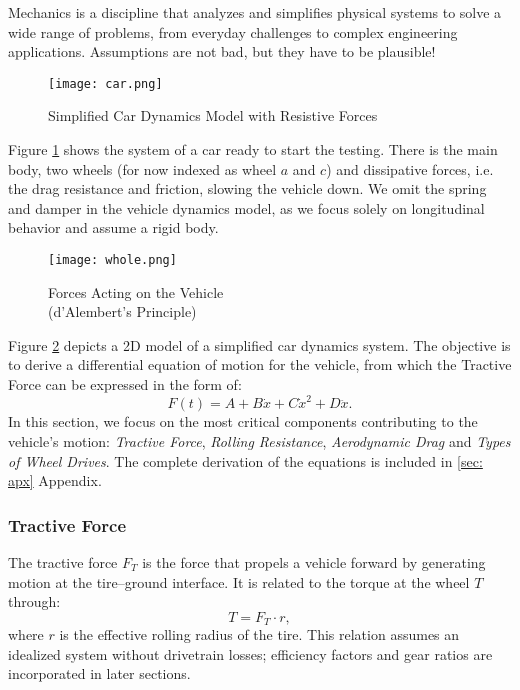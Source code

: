 Mechanics is a discipline that analyzes and simplifies physical systems to solve a wide range of problems, from everyday challenges to complex engineering applications. Assumptions are not bad, but they have to be plausible!
\begin{figure}[H]
	\begin{center}
		\texttt{[image: car.png]}
	\end{center}
	\caption{Simplified Car Dynamics Model with Resistive Forces}
	\label{fig: model}
\end{figure}
	Figure \ref{fig: model} shows the system of a car ready to start the testing. There is the main body, two wheels (for now indexed as wheel $a$ and $c$) and dissipative forces, i.e. the drag resistance and friction, slowing the vehicle down. We omit the spring and damper in the vehicle dynamics model, as we focus solely on longitudinal behavior and assume a rigid body.
\begin{figure}[H]
	\begin{center}
		\texttt{[image: whole.png]}
	\end{center}
	\caption{Forces Acting on the Vehicle \\(d'Alembert's Principle)}
	\label{fig: forces}
\end{figure}
Figure \ref{fig: forces} depicts a 2D model of a simplified car dynamics system. The objective is to derive a differential equation of motion for the vehicle, from which the Tractive Force can be expressed in the form of:
\begin{equation*}
	F(t) = A + B\dot x + C\dot x^2 + D\ddot x.
\end{equation*}
In this section, we focus on the most critical components contributing to the vehicle's motion:  \textit{Tractive Force}, \textit{Rolling Resistance}, \textit{Aerodynamic Drag} and \textit{Types of Wheel Drives}. The complete derivation of the equations is included in \ref{sec: apx} Appendix.
\subsubsection*{Tractive Force}
	The tractive force $F_T$ is the force that propels a vehicle forward by generating motion at the tire–ground interface. It is related to the torque at the wheel $T$ through:
	\begin{equation*}
		T = F_T\cdot r,
	\end{equation*}
	where $r$ is the effective rolling radius of the tire. This relation assumes an idealized system without drivetrain losses; efficiency factors and gear ratios are incorporated in later sections.
